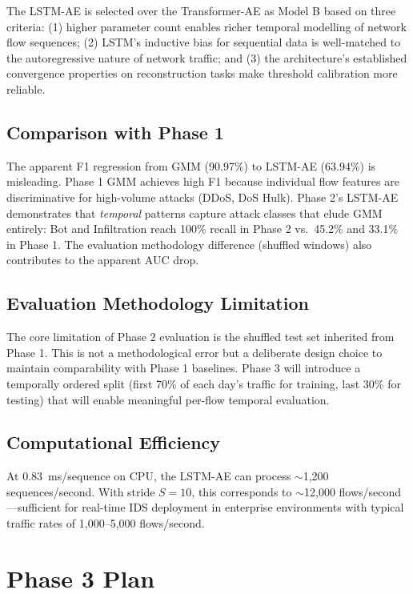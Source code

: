 \documentclass[conference]{IEEEtran}
\begin{document}
The LSTM-AE is selected over the Transformer-AE as Model B based on three criteria:
(1) higher parameter count enables richer temporal modelling of network flow sequences;
(2) LSTM's inductive bias for sequential data is well-matched to the autoregressive nature
of network traffic; and (3) the architecture's established convergence properties on
reconstruction tasks make threshold calibration more reliable.

\subsection{Comparison with Phase 1}

The apparent F1 regression from GMM (90.97\%) to LSTM-AE (63.94\%) is misleading. Phase 1 GMM
achieves high F1 because individual flow features are discriminative for high-volume attacks
(DDoS, DoS Hulk). Phase 2's LSTM-AE demonstrates that \emph{temporal} patterns capture attack
classes that elude GMM entirely: Bot and Infiltration reach 100\% recall in Phase 2 vs.~45.2\%
and 33.1\% in Phase 1. The evaluation methodology difference (shuffled windows) also contributes
to the apparent AUC drop.

\subsection{Evaluation Methodology Limitation}

The core limitation of Phase 2 evaluation is the shuffled test set inherited from Phase 1.
This is not a methodological error but a deliberate design choice to maintain comparability with
Phase 1 baselines. Phase 3 will introduce a temporally ordered split (first 70\% of each
day's traffic for training, last 30\% for testing) that will enable meaningful per-flow
temporal evaluation.

\subsection{Computational Efficiency}

At 0.83~ms/sequence on CPU, the LSTM-AE can process $\sim$1,200 sequences/second. With stride
$S=10$, this corresponds to $\sim$12,000 flows/second—sufficient for real-time IDS deployment
in enterprise environments with typical traffic rates of 1,000--5,000 flows/second.

\section{Phase 3 Plan}
\end{document}
